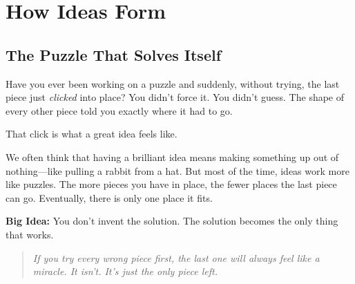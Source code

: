 \documentclass[12pt]{book}
\begin{document}
\part{How Ideas Form}

\chapter{The Puzzle That Solves Itself}

Have you ever been working on a puzzle and suddenly, without trying, the
last piece just \emph{clicked} into place? You didn't force it. You didn't
guess. The shape of every other piece told you exactly where it had to go.

That click is what a great idea feels like.

We often think that having a brilliant idea means making something up out
of nothing---like pulling a rabbit from a hat. But most of the time, ideas
work more like puzzles. The more pieces you have in place, the fewer places
the last piece can go. Eventually, there is only one place it fits.

\textbf{Big Idea:} You don't invent the solution. The solution becomes the
only thing that works.

\begin{quote}\itshape
If you try every wrong piece first, the last one will always feel like a
miracle. It isn't. It's just the only piece left.
\end{quote}
\end{document}
